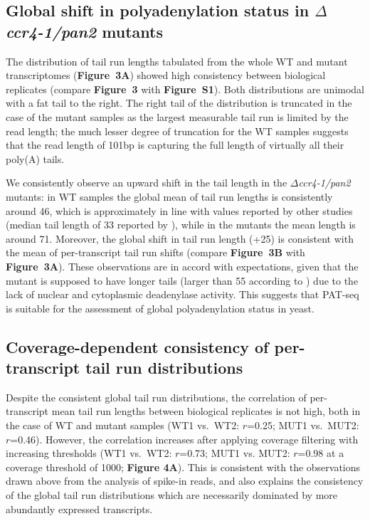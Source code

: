 \documentclass[10pt]{article}
\begin{document}
\subsection*{Global shift in polyadenylation status in \textit{$\Delta$ccr4-1/pan2} mutants}

The distribution of tail run lengths tabulated from the whole WT and mutant transcriptomes (\textbf{Figure~3A}) showed high consistency between biological replicates (compare \textbf{Figure~3} with \textbf{Figure~S1}). Both distributions are unimodal with a fat tail to the right. The right tail of the distribution is truncated in the case of the mutant samples as the largest measurable tail run is limited by the read length; the much lesser degree of truncation for the WT samples suggests that the read length of 101bp is capturing the full length of virtually all their poly(A) tails.

We consistently observe an upward shift in the tail length in the \textit{$\Delta$ccr4-1/pan2} mutants: in WT samples the global mean of tail run lengths is consistently around 46, which is approximately in line with values reported by other studies (median tail length of 33 reported by \cite{subtelny14}), while in the mutants the mean length is around 71. Moreover, the global shift in tail run length (+25) is consistent with the mean of per-transcript tail run shifts (compare \textbf{Figure~3B} with \textbf{Figure~3A}). These observations are in accord with expectations, given that the mutant is supposed to have longer tails (larger than 55 according to \cite{beilharz07}) due to the lack of nuclear and cytoplasmic deadenylase activity. This suggests that PAT-seq is suitable for the assessment of global polyadenylation status in yeast.

\subsection*{Coverage-dependent consistency of per-transcript tail run distributions}

Despite the consistent global tail run distributions, the correlation of per-transcript mean tail run lengths between biological replicates is not high, both in the case of WT and mutant samples (WT1 vs.\ WT2: $r$=0.25; MUT1 vs.\ MUT2: $r$=0.46). However, the correlation increases after applying coverage filtering with increasing thresholds (WT1 vs.\ WT2: $r$=0.73; MUT1 vs. MUT2: $r$=0.98 at a coverage threshold of 1000; \textbf{Figure 4A}). This is consistent with the observations drawn above from the analysis of spike-in reads, and also explains the consistency of the global tail run distributions which are necessarily dominated by more abundantly expressed transcripts.
\end{document}
